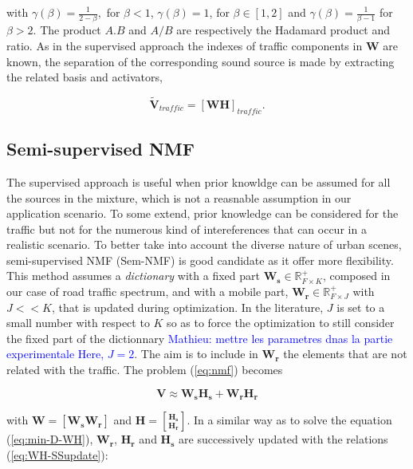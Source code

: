 \documentclass[twocolumn,a4paper,10pt]{article}
\newcommand{\ml}[1]{\textcolor{blue}{ Mathieu: #1}}
\begin{document}
with $\gamma(\beta) = \frac{1}{2-\beta},$ for $\beta < 1$, $ \gamma(\beta) = 1$, for $\beta \in \left[1,2\right]$ and $\gamma(\beta) = \frac{1}{\beta-1}$ for $\beta > 2$. The product $A.B$ and $A/B$ are respectively the Hadamard product and ratio. As in the supervised approach the indexes of traffic components in $\mathbf{W}$  are known, the separation of the corresponding sound source is made by extracting the related basis and activators,

\begin{equation}\label{eq:separationExtraction}
\mathbf{\tilde{V}}_{traffic} = \left[ \mathbf{WH} \right]_{traffic}.
\end{equation}

\subsection{Semi-supervised NMF}

The supervised approach is useful when prior knowldge can be assumed for all the sources in the mixture, which is not a reasnable assumption in our application scenario. To some extend, prior knowledge can be considered for the traffic but not for the numerous kind of intereferences that can occur in a realistic scenario. To better take into account the diverse nature of urban scenes, semi-supervised NMF (Sem-NMF)\cite{lee_semi-supervised_2010} is good candidate as it offer more flexibility. This method assumes a \textit{dictionary} with a fixed part $\mathbf{W_s} \in \mathbb{R}^+_{F\times K}$, composed in our case of road traffic spectrum, and with a mobile part, $\mathbf{W_r} \in \mathbb{R}^+_{F\times J}$ with $J <<K$, that is updated during optimization. In the literature, $J$ is set to a small number with respect to $K$ so as to force the optimization to still consider the fixed part of the dictionnary \cite{fevotte ?} \ml{mettre les parametres dnas la partie experimentale Here, $J = 2$}. The aim is to include in $\mathbf{W_r}$ the elements that are not related with the traffic. The problem (\ref{eq:nmf}) becomes

\begin{equation}
\mathbf{V} \approx \mathbf{W_s H_s}+ \mathbf{W_r H_r}
\end{equation}

 with $\mathbf{W} = \left[\mathbf{W_s} \mathbf{W_r} \right]$ and $\mathbf{H} = \genfrac[]{0pt}{0}{\mathbf{H_s}}{\mathbf{H_r}}$. In a similar way as to solve the equation (\ref{eq:min-D-WH}), $\mathbf{W_r}$, $\mathbf{H_r}$ and $\mathbf{H_s}$ are successively updated with the relations (\ref{eq:WH-SSupdate}):
\end{document}

